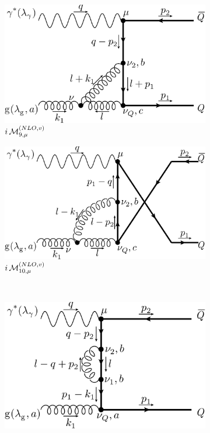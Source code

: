 \begin{figure}[ht!]
	\begin{subfigure}[t]{.4\textwidth}
		\includegraphics[width=\textwidth]{pyfeyn/nlo-v-g2}
		\caption{$i\operatorname{\mathcal M}^{(NLO,v)}_{9,\mu}$}
	\end{subfigure}\hspace{.15\textwidth}%
	\begin{subfigure}[t]{.4\textwidth}
		\includegraphics[width=\textwidth]{pyfeyn/nlo-v-g2cr}
		\caption{$i\operatorname{\mathcal M}^{(NLO,v)}_{10,\mu}$}
	\end{subfigure}\\
	\begin{subfigure}[t]{.4\textwidth}
		\includegraphics[width=\textwidth]{pyfeyn/nlo-v-m1}

\end{subfigure}
\end{figure}
